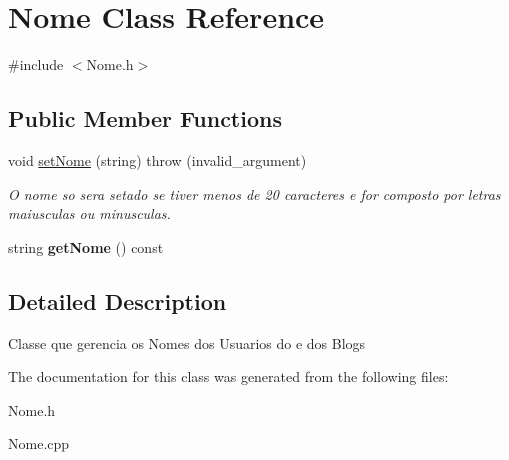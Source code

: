 \hypertarget{classNome}{}\section{Nome Class Reference}
\label{classNome}


{\ttfamily \#include $<$Nome.\+h$>$}

\subsection*{Public Member Functions}
\begin{DoxyCompactItemize}
\item 
void \hyperlink{classNome_ab1507b81047efb89b50b6be0d33c08e5}{set\+Nome} (string)  throw (invalid\+\_\+argument)\hypertarget{classNome_ab1507b81047efb89b50b6be0d33c08e5}{}\label{classNome_ab1507b81047efb89b50b6be0d33c08e5}

\begin{DoxyCompactList}\small\item\em O nome so sera setado se tiver menos de 20 caracteres e for composto por letras maiusculas ou minusculas. \end{DoxyCompactList}\item 
string {\bfseries get\+Nome} () const \hypertarget{classNome_a099de6e73b92016fbf2ecbe1b036b149}{}\label{classNome_a099de6e73b92016fbf2ecbe1b036b149}

\end{DoxyCompactItemize}


\subsection{Detailed Description}
Classe que gerencia os Nomes dos Usuarios do e dos Blogs 

The documentation for this class was generated from the following files\+:\begin{DoxyCompactItemize}
\item 
Nome.\+h\item 
Nome.\+cpp\end{DoxyCompactItemize}
